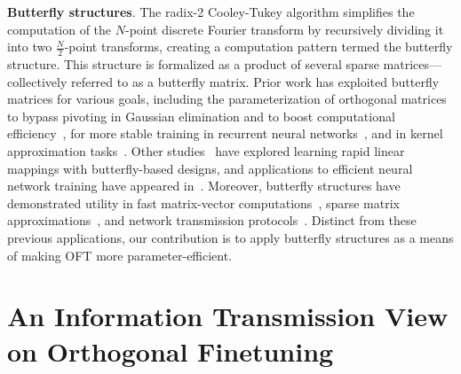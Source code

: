 \textbf{Butterfly structures}. The radix-2 Cooley-Tukey algorithm simplifies the computation of the $N$-point discrete Fourier transform by recursively dividing it into two $\frac{N}{2}$-point transforms, creating a computation pattern termed the butterfly structure. This structure is formalized as a product of several sparse matrices—collectively referred to as a butterfly matrix. Prior work has exploited butterfly matrices for various goals, including the parameterization of orthogonal matrices to bypass pivoting in Gaussian elimination and to boost computational efficiency~\cite{parker1995random}, for more stable training in recurrent neural networks~\cite{jing2017tunable}, and in kernel approximation tasks~\cite{munkhoeva2018quadrature}. Other studies~\cite{dao2019learning,dao2019kaleidoscope} have explored learning rapid linear mappings with butterfly-based designs, and applications to efficient neural network training have appeared in~\cite{chen2022pixelated,dao2022monarch}. Moreover, butterfly structures have demonstrated utility in fast matrix-vector computations~\cite{michielssen1996multilevel,o2010algorithm}, sparse matrix approximations~\cite{li2015butterfly}, and network transmission protocols~\cite{klasing1994broadcasting,li2003linear,rajasingh2016transmission}. Distinct from these previous applications, our contribution is to apply butterfly structures as a means of making OFT more parameter-efficient.

\section{An Information Transmission View on Orthogonal Finetuning}

